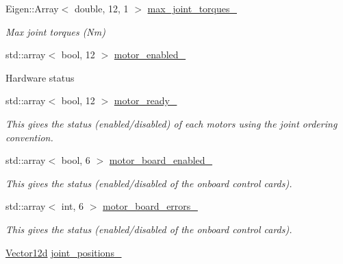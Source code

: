 \begin{DoxyCompactItemize}
Eigen\+::\+Array$<$ double, 12, 1 $>$ \hyperlink{classblmc__robots_1_1Solo12_a8eab2e983bfe76eafbcf054c385340a3}{max\+\_\+joint\+\_\+torques\+\_\+}
\begin{DoxyCompactList}\small\item\em Max joint torques (Nm) \end{DoxyCompactList}\item 
std\+::array$<$ bool, 12 $>$ \hyperlink{classblmc__robots_1_1Solo12_a50b6c097724e01436424b1f1c8dd0dd2}{motor\+\_\+enabled\+\_\+}
\begin{DoxyCompactList}\small\item\em 

 Hardware status \end{DoxyCompactList}\item 
\mbox{\label{classblmc__robots_1_1Solo12_a653320521b1f1833edf592b5f89cc3a8}} 
std\+::array$<$ bool, 12 $>$ \hyperlink{classblmc__robots_1_1Solo12_a653320521b1f1833edf592b5f89cc3a8}{motor\+\_\+ready\+\_\+}
\begin{DoxyCompactList}\small\item\em This gives the status (enabled/disabled) of each motors using the joint ordering convention. \end{DoxyCompactList}\item 
\mbox{\label{classblmc__robots_1_1Solo12_a33269cf4037c0a3812fe8127dcf65976}} 
std\+::array$<$ bool, 6 $>$ \hyperlink{classblmc__robots_1_1Solo12_a33269cf4037c0a3812fe8127dcf65976}{motor\+\_\+board\+\_\+enabled\+\_\+}
\begin{DoxyCompactList}\small\item\em This gives the status (enabled/disabled of the onboard control cards). \end{DoxyCompactList}\item 
\mbox{\label{classblmc__robots_1_1Solo12_af08cfab9b12464b12d2991c0b3376631}} 
std\+::array$<$ int, 6 $>$ \hyperlink{classblmc__robots_1_1Solo12_af08cfab9b12464b12d2991c0b3376631}{motor\+\_\+board\+\_\+errors\+\_\+}
\begin{DoxyCompactList}\small\item\em This gives the status (enabled/disabled of the onboard control cards). \end{DoxyCompactList}\item 
\hyperlink{common__header_8hpp_a80313eb420184518596e745eecf4b494}{Vector12d} \hyperlink{classblmc__robots_1_1Solo12_a30531d872c6de968876110416ce777a9}{joint\+\_\+positions\+\_\+}

\end{DoxyCompactItemize}
